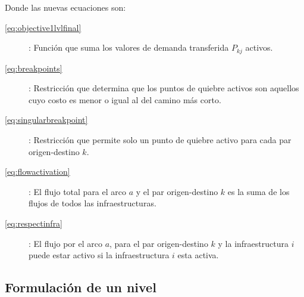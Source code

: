 \documentclass{article}
\begin{document}
  Donde las nuevas ecuaciones son:

  \begin{description}
    \item[\ref{eq:objective1lvlfinal}]: Función que suma los valores de demanda transferida $P_{kj}$ activos.
    \item[\ref{eq:breakpoints}]: Restricción que determina que los puntos de quiebre activos son aquellos cuyo costo es menor o igual al del camino más corto.
    \item[\ref{eq:singularbreakpoint}]: Restricción que permite solo un punto de quiebre activo para cada par origen-destino $k$.
    \item[\ref{eq:flowactivation}]: El flujo total para el arco $a$ y el par origen-destino $k$ es la suma de los flujos de todos las infraestructuras.
    \item[\ref{eq:respectinfra}]: El flujo por el arco $a$, para el par origen-destino $k$ y la infraestructura $i$ puede estar activo si la infraestructura $i$ esta activa.  
  \end{description}

  \subsection*{Formulación de un nivel}
\end{document}
